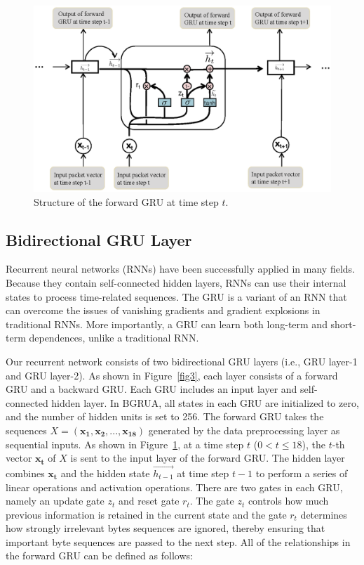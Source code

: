 \documentclass[preprint,12pt]{elsarticle}
\begin{document}
\begin{figure}[hbt]
\includegraphics[width=\textwidth]{gru.eps}
\caption{Structure of the forward GRU at time step $t$.}\label{fig4}
\end{figure}


\subsection{Bidirectional GRU Layer} \label{sec: bidirectional_gru_layer}
Recurrent neural networks (RNNs) \cite{mikolov2010recurrent} have been successfully applied in many fields. Because they contain self-connected hidden layers, RNNs can use their internal states to process time-related sequences. The GRU is a variant of an RNN that can overcome the issues of vanishing gradients and gradient explosions in traditional RNNs. More importantly, a GRU can learn both long-term and short-term dependences, unlike a traditional RNN.

Our recurrent network consists of two bidirectional GRU layers (i.e., GRU layer-1 and GRU layer-2). As shown in Figure~\ref{fig3}, each layer consists of a forward GRU and a backward GRU. Each GRU includes an input layer and self-connected hidden layer. In BGRUA, all states in each GRU are initialized to zero, and the number of hidden units is set to 256. The forward GRU takes the sequences $X = (\mathbf{x_1}, \mathbf{x_2},..., \mathbf{x_{18}})$ generated by the data preprocessing layer as sequential inputs. As shown in Figure~\ref{fig4}, at a time step $t$ ($0 < t \leq 18$), the $t$-th vector $\mathbf{x_t}$ of $X$ is sent to the input layer of the forward GRU. The hidden layer combines $\mathbf{x_t}$ and the hidden state $\overrightarrow{h_{t-1}}$ at time step $t-1$ to perform a series of linear operations and activation operations. There are two gates in each GRU, namely an update gate $z_t$ and reset gate $r_t$. The gate $z_t$ controls how much previous information is retained in the current state and the gate $r_t$ determines how strongly irrelevant bytes sequences are ignored, thereby ensuring that important byte sequences are passed to the next step. All of the relationships in the forward GRU can be defined as follows:
 
\end{document}
